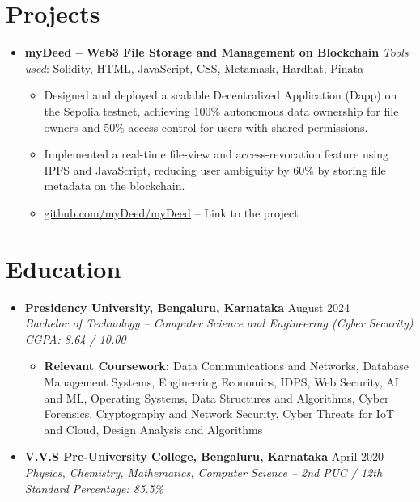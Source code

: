 \documentclass[letterpaper,10pt]{article}
\newcommand{\resumeItem}[1]{\item \small #1}
\newcommand{\resumeSubheading}[4]{%
  \vspace{4pt}\item
  {\large\bfseries #1} \hfill {\small #2} \\[-1pt]
  {\itshape\footnotesize #3} \hfill {\itshape\footnotesize #4}%
  \vspace{1pt}%
}
\newcommand{\resumeProjectHeading}[1]{%
  \vspace{2pt}\item #1\vspace{1pt}%
}
\newcommand{\resumeSubHeadingListStart}{%
  \begin{itemize}[leftmargin=0.15in, label={}, topsep=2pt, partopsep=0pt, itemsep=0pt]%
}
\newcommand{\resumeSubHeadingListEnd}{\end{itemize}\vspace{-2pt}}
\newcommand{\resumeItemListStart}{%
  \begin{itemize}[leftmargin=0.2in, itemsep=2pt, topsep=2pt, parsep=0pt]%
}
\newcommand{\resumeItemListEnd}{\end{itemize}\vspace{-1pt}}
\begin{document}
\section{Projects}
\resumeSubHeadingListStart

\resumeProjectHeading{%
  \textbf{\large myDeed -- Web3 File Storage and Management on Blockchain}\newline
  {\footnotesize \textit{Tools used}: Solidity, HTML, JavaScript, CSS, Metamask, Hardhat, Pinata}%
}
\resumeItemListStart
    \resumeItem{Designed and deployed a scalable Decentralized Application (Dapp) on the Sepolia testnet, achieving 100\% autonomous data ownership for file owners and 50\% access control for users with shared permissions.}
    \resumeItem{Implemented a real-time file-view and access-revocation feature using IPFS and JavaScript, reducing user ambiguity by 60\% by storing file metadata on the blockchain.}
    \resumeItem{\href{https://github.com/myDeed/myDeed}{\underline{github.com/myDeed/myDeed}} -- Link to the project}
  \resumeItemListEnd

\resumeSubHeadingListEnd

\section{Education}
\resumeSubHeadingListStart

  \resumeSubheading
  {Presidency University, Bengaluru, Karnataka}{August 2024}
  {Bachelor of Technology -- Computer Science and Engineering (Cyber Security)}{CGPA: 8.64 / 10.00}
  \resumeItemListStart
    \resumeItem{\textbf{Relevant Coursework:} Data Communications and Networks, Database Management Systems, Engineering Economics, IDPS, Web Security, AI and ML, Operating Systems, Data Structures and Algorithms, Cyber Forensics, Cryptography and Network Security, Cyber Threats for IoT and Cloud, Design Analysis and Algorithms}
  \resumeItemListEnd

  \resumeSubheading
  {V.V.S Pre-University College, Bengaluru, Karnataka}{April 2020}
  {Physics, Chemistry, Mathematics, Computer Science -- 2nd PUC / 12th Standard}{Percentage: 85.5\%}

\resumeSubHeadingListEnd

\end{document}
